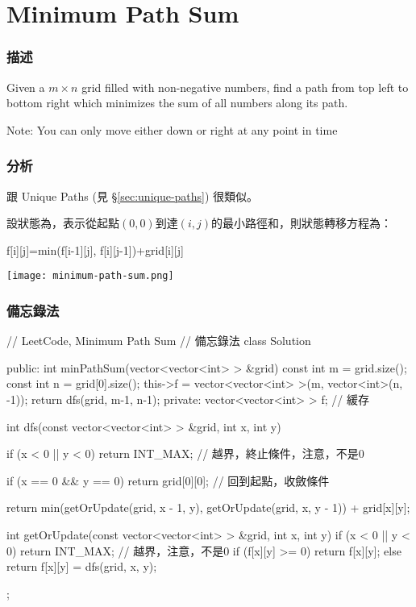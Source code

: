 \section{Minimum Path Sum} %
\label{sec:minimum-path-sum}


\subsubsection{描述}
Given a $m \times n$ grid filled with non-negative numbers, find a path from top left to bottom right which minimizes the sum of all numbers along its path.

Note: You can only move either down or right at any point in time


\subsubsection{分析}
跟 Unique Paths (見 \S \ref{sec:unique-paths}) 很類似。

設狀態為，表示從起點$(0,0)$到達$(i,j)$的最小路徑和，則狀態轉移方程為：
\begin{Code}
f[i][j]=min(f[i-1][j], f[i][j-1])+grid[i][j]
\end{Code}

\begin{center}
\texttt{[image: minimum-path-sum.png]}\\
\label{fig:minimum-path-sum}
\end{center}


\subsubsection{備忘錄法}
\begin{Code}
// LeetCode, Minimum Path Sum
// 備忘錄法
class Solution {
public:
    int minPathSum(vector<vector<int> > &grid) {
        const int m = grid.size();
        const int n = grid[0].size();
        this->f = vector<vector<int> >(m, vector<int>(n, -1));
        return dfs(grid, m-1, n-1);
    }
private:
    vector<vector<int> > f;  // 緩存

    int dfs(const vector<vector<int> > &grid, int x, int y) {
        if (x < 0 || y < 0) return INT_MAX; // 越界，終止條件，注意，不是0

        if (x == 0 && y == 0) return grid[0][0]; // 回到起點，收斂條件

        return min(getOrUpdate(grid, x - 1, y),
                getOrUpdate(grid, x, y - 1)) + grid[x][y];
    }

    int getOrUpdate(const vector<vector<int> > &grid, int x, int y) {
        if (x < 0 || y < 0) return INT_MAX; // 越界，注意，不是0
        if (f[x][y] >= 0) return f[x][y];
        else return f[x][y] = dfs(grid, x, y);
    }
};
\end{Code}


